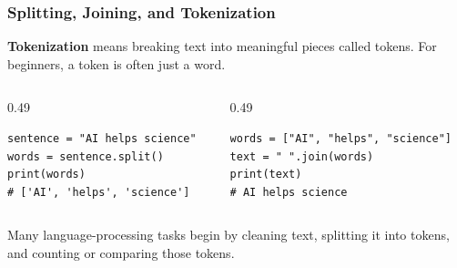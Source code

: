 \documentclass[aspectratio=169,10pt]{beamer}
\newcommand{\keyword}[1]{\textcolor{PrimaryBlue}{\textbf{#1}}}
\begin{document}
\begin{frame}[fragile]
\frametitle{Splitting, Joining, and Tokenization}
\small
\keyword{Tokenization} means breaking text into meaningful pieces called tokens. For beginners, a token is often just a word.

\vspace{0.15cm}
\begin{columns}[T,totalwidth=0.96\textwidth]
\begin{column}{0.49\textwidth}
\begin{tcolorbox}[lecturebox,title=Split text]
\begin{lstlisting}[style=pycodesmall]
sentence = "AI helps science"
words = sentence.split()
print(words)
# ['AI', 'helps', 'science']
\end{lstlisting}
\end{tcolorbox}
\end{column}
\begin{column}{0.49\textwidth}
\begin{tcolorbox}[lecturebox,title=Join text]
\begin{lstlisting}[style=pycodesmall]
words = ["AI", "helps", "science"]
text = " ".join(words)
print(text)
# AI helps science
\end{lstlisting}
\end{tcolorbox}
\end{column}
\end{columns}

\vspace{0.2cm}
\begin{tcolorbox}[lecturebox,title=NLP preview]
Many language-processing tasks begin by cleaning text, splitting it into tokens, and counting or comparing those tokens.
\end{tcolorbox}

\end{frame}
\end{document}
